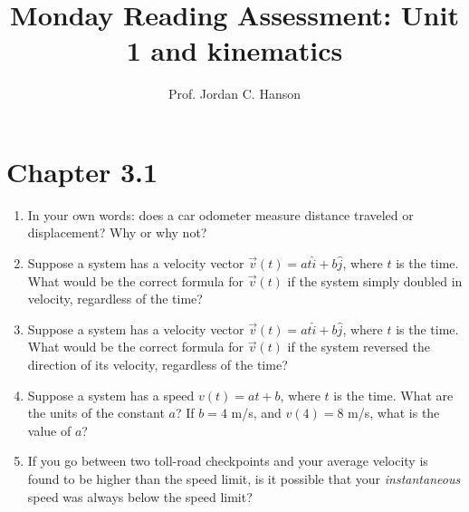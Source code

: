 \documentclass{article}
\begin{document}
\title{Monday Reading Assessment: Unit 1 and kinematics}
\author{Prof. Jordan C. Hanson}

\maketitle

\section{Chapter 3.1}

\begin{enumerate}
\item In your own words: does a car odometer measure distance traveled or displacement?  Why or why not?  \\ \vspace{2cm}
\item Suppose a system has a velocity vector $\vec{v}(t) = a t \hat{i} + b \hat{j}$, where $t$ is the time.  What would be the correct formula for $\vec{v}(t)$ if the system simply doubled in velocity, regardless of the time? \\ \vspace{2cm}
\item Suppose a system has a velocity vector $\vec{v}(t) = a t \hat{i} + b \hat{j}$, where $t$ is the time.  What would be the correct formula for $\vec{v}(t)$ if the system reversed the direction of its velocity, regardless of the time? \\ \vspace{2cm}
\item Suppose a system has a speed $v(t) = a t + b$, where $t$ is the time.  What are the units of the constant $a$?  If $b=4$ m/s, and $v(4) = 8$ m/s, what is the value of $a$? \\ \vspace{2cm}
\item If you go between two toll-road checkpoints and your average velocity is found to be higher than the speed limit, is it possible that your \textit{instantaneous} speed was always below the speed limit? \\ \vspace{3cm}
\end{enumerate}
\end{document}
